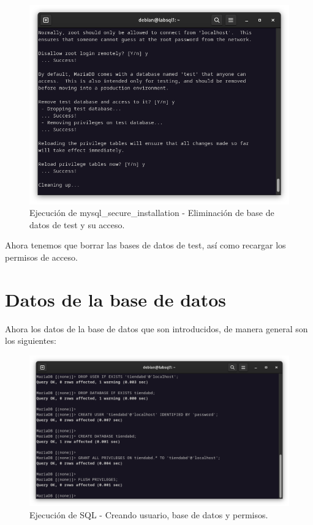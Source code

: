 \begin{figure}[H]
	\centering
	\includegraphics[scale=0.30]{03}
	\caption{Ejecución de mysql\_secure\_installation - Eliminación de base de datos de test y su acceso.}
\end{figure}

Ahora tenemos que borrar las bases de datos de test, así como recargar los permisos de acceso.

\newpage
\section{Datos de la base de datos}

Ahora los datos de la base de datos que son introducidos, de manera general son los siguientes:

\begin{figure}[H]
	\centering
	\includegraphics[scale=0.30]{04}
	\caption{Ejecución de SQL - Creando usuario, base de datos y permisos.}
\end{figure}

